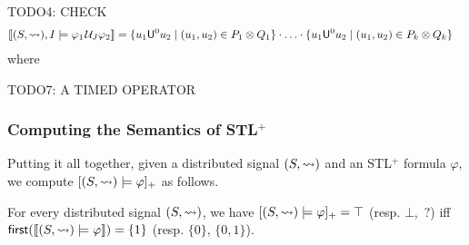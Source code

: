 \small
\alert{TODO4: CHECK}
\begin{align*}
	\llbracket (S, {\hb}), I \models \varphi_1 \until_J \varphi_2 \rrbracket &= \{ u_1 \mathsf{U}^0 u_2 \st (u_1, u_2) \in P_1 \otimes Q_1 \} \cdot \ldots \cdot \{ u_1 \mathsf{U}^0 u_2 \st (u_1, u_2) \in P_k \otimes Q_k \}
\end{align*}
\normalsize
where \TODO



\begin{example}
	\alert{TODO7: A TIMED OPERATOR}
\end{example}

\subsubsection{Computing the Semantics of STL$^+$}

Putting it all together, given a distributed signal $(S, {\rightsquigarrow})$ and an STL$^+$ formula $\varphi$, we compute $[(S,{\rightsquigarrow}) \models \varphi]_+$ as follows.

\begin{theorem} \label{cl:algo}
	For every distributed signal $(S,{\rightsquigarrow})$, we have $[(S,{\rightsquigarrow}) \models \varphi]_+ = \top$ (resp. $\bot$, ${\,?}$) iff $\textsf{first}(\llbracket (S, {\rightsquigarrow}) \models \varphi \rrbracket) = \{1\}$ (resp. $\{0\}$, $\{0,1\}$).
\end{theorem}

